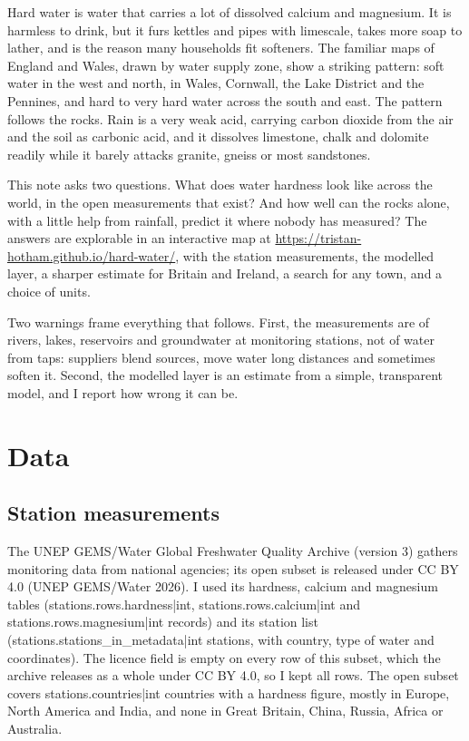\documentclass[11pt,a4paper]{article}
\begin{document}
Hard water is water that carries a lot of dissolved calcium and magnesium. It is harmless to drink, but it furs kettles and pipes with limescale, takes more soap to lather, and is the reason many households fit softeners. The familiar maps of England and Wales, drawn by water supply zone, show a striking pattern: soft water in the west and north, in Wales, Cornwall, the Lake District and the Pennines, and hard to very hard water across the south and east. The pattern follows the rocks. Rain is a very weak acid, carrying carbon dioxide from the air and the soil as carbonic acid, and it dissolves limestone, chalk and dolomite readily while it barely attacks granite, gneiss or most sandstones.

This note asks two questions. What does water hardness look like across the world, in the open measurements that exist? And how well can the rocks alone, with a little help from rainfall, predict it where nobody has measured? The answers are explorable in an interactive map at \url{https://tristan-hotham.github.io/hard-water/}, with the station measurements, the modelled layer, a sharper estimate for Britain and Ireland, a search for any town, and a choice of units.

Two warnings frame everything that follows. First, the measurements are of rivers, lakes, reservoirs and groundwater at monitoring stations, not of water from taps: suppliers blend sources, move water long distances and sometimes soften it. Second, the modelled layer is an estimate from a simple, transparent model, and I report how wrong it can be.

\section{Data}

\subsection{Station measurements}

The UNEP GEMS/Water Global Freshwater Quality Archive (version 3) gathers monitoring data from national agencies; its open subset is released under CC BY 4.0 (UNEP GEMS/Water 2026). I used its hardness, calcium and magnesium tables ({{stations.rows.hardness|int}}, {{stations.rows.calcium|int}} and {{stations.rows.magnesium|int}} records) and its station list ({{stations.stations_in_metadata|int}} stations, with country, type of water and coordinates). The licence field is empty on every row of this subset, which the archive releases as a whole under CC BY 4.0, so I kept all rows. The open subset covers {{stations.countries|int}} countries with a hardness figure, mostly in Europe, North America and India, and none in Great Britain, China, Russia, Africa or Australia.
\end{document}
